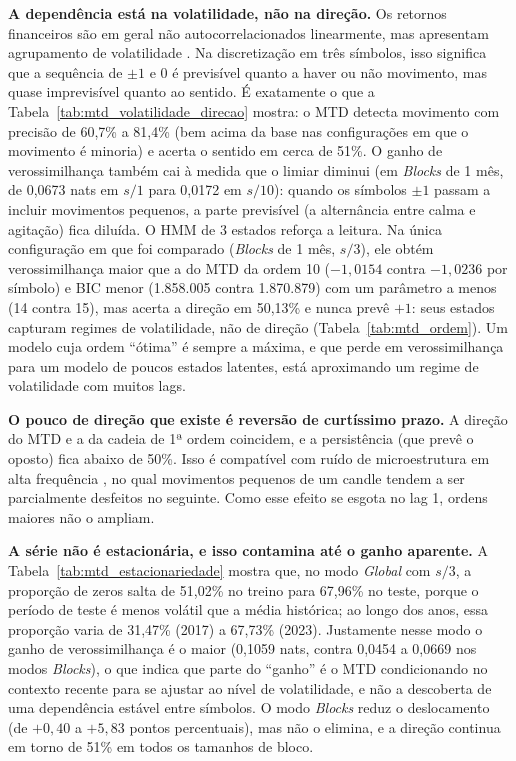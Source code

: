 \documentclass[
    12pt,                %
    openright,           %
    oneside,             %
    a4paper,             %
    english,             %
    brazil               %
]{abntex2}
\begin{document}
\textbf{A dependência está na volatilidade, não na direção.} Os retornos financeiros são em geral não autocorrelacionados linearmente, mas apresentam agrupamento de volatilidade \cite{morettin2018analise}. Na discretização em três símbolos, isso significa que a sequência de $\pm1$ e 0 é previsível quanto a haver ou não movimento, mas quase imprevisível quanto ao sentido. É exatamente o que a Tabela~\ref{tab:mtd_volatilidade_direcao} mostra: o MTD detecta movimento com precisão de 60,7\% a 81,4\% (bem acima da base nas configurações em que o movimento é minoria) e acerta o sentido em cerca de 51\%. O ganho de verossimilhança também cai à medida que o limiar diminui (em \textit{Blocks} de 1 mês, de 0,0673 nats em $s/1$ para 0,0172 em $s/10$): quando os símbolos $\pm1$ passam a incluir movimentos pequenos, a parte previsível (a alternância entre calma e agitação) fica diluída. O HMM de 3 estados reforça a leitura. Na única configuração em que foi comparado (\textit{Blocks} de 1 mês, $s/3$), ele obtém verossimilhança maior que a do MTD da ordem 10 ($-1{,}0154$ contra $-1{,}0236$ por símbolo) e BIC menor (1.858.005 contra 1.870.879) com um parâmetro a menos (14 contra 15), mas acerta a direção em 50,13\% e nunca prevê $+1$: seus estados capturam regimes de volatilidade, não de direção (Tabela~\ref{tab:mtd_ordem}). Um modelo cuja ordem ``ótima'' é sempre a máxima, e que perde em verossimilhança para um modelo de poucos estados latentes, está aproximando um regime de volatilidade com muitos lags.

\textbf{O pouco de direção que existe é reversão de curtíssimo prazo.} A direção do MTD e a da cadeia de 1ª ordem coincidem, e a persistência (que prevê o oposto) fica abaixo de 50\%. Isso é compatível com ruído de microestrutura em alta frequência \cite{jjfinec}, no qual movimentos pequenos de um candle tendem a ser parcialmente desfeitos no seguinte. Como esse efeito se esgota no lag 1, ordens maiores não o ampliam.

\textbf{A série não é estacionária, e isso contamina até o ganho aparente.} A Tabela~\ref{tab:mtd_estacionariedade} mostra que, no modo \textit{Global} com $s/3$, a proporção de zeros salta de 51,02\% no treino para 67,96\% no teste, porque o período de teste é menos volátil que a média histórica; ao longo dos anos, essa proporção varia de 31,47\% (2017) a 67,73\% (2023). Justamente nesse modo o ganho de verossimilhança é o maior (0,1059 nats, contra 0,0454 a 0,0669 nos modos \textit{Blocks}), o que indica que parte do ``ganho'' é o MTD condicionando no contexto recente para se ajustar ao nível de volatilidade, e não a descoberta de uma dependência estável entre símbolos. O modo \textit{Blocks} reduz o deslocamento (de $+0{,}40$ a $+5{,}83$ pontos percentuais), mas não o elimina, e a direção continua em torno de 51\% em todos os tamanhos de bloco.
\end{document}
